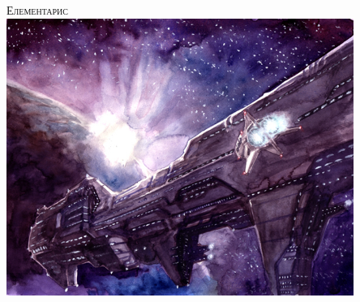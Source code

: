 \begin{titlepage}
\begin{center}

\textsc{\Huge Елементарис}\\[1.5cm]
\includegraphics[width=0.85\textwidth]{../images/spaceship1}~
\\[1cm]

\vfill

\date{}

\end{center}
\end{titlepage}
